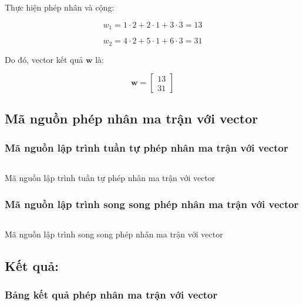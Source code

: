 Thực hiện phép nhân và cộng:

\[ w_1 = 1 \cdot 2 + 2 \cdot 1 + 3 \cdot 3 = 13 \]

\[ w_2 = 4 \cdot 2 + 5 \cdot 1 + 6 \cdot 3 = 31 \]

Do đó, vector kết quả \( \mathbf{w} \) là:

\[ \mathbf{w} = \begin{bmatrix} 13 \\ 31 \end{bmatrix} \]




\subsection{Mã nguồn phép nhân ma trận với vector}

\subsubsection{Mã nguồn lập trình tuần tự phép nhân ma trận với vector}
\begin{listing}[H]
 \centering
 \inputminted{cpp}{sources/MaNguon1TT.cpp}
 \caption{Mã nguồn lập trình tuần tự phép nhân ma trận với vector}
 \label{code:MaNguon1TT}
\end{listing}

\subsubsection{Mã nguồn lập trình song song phép nhân ma trận với vector}
\begin{listing}[H]
 \centering
 \inputminted{cpp}{sources/MaNguon1SS.cpp}
 \caption{Mã nguồn lập trình song song phép nhân ma trận với vector}
 \label{code:MaNguon1SS}
\end{listing}














\subsection{Kết quả:}
\subsubsection{Bảng kết quả phép nhân ma trận với vector}




